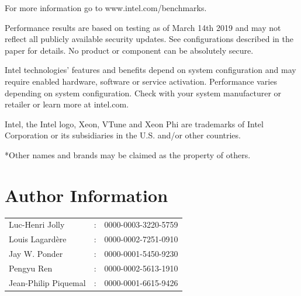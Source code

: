 \documentclass[9pt,comparison]{livecoms}
\begin{document}
For more information go to www.intel.com/benchmarks.

Performance results are based on testing as of March 14th 2019 and may not reflect all publicly available security updates.  See configurations described in the paper for details.  No product or component can be absolutely secure.

Intel technologies’ features and benefits depend on system configuration and may require enabled hardware, software or service activation. Performance varies depending on system configuration. Check with your system manufacturer or retailer or learn more at intel.com.

Intel, the Intel logo, Xeon, VTune and Xeon Phi are trademarks of Intel Corporation or its subsidiaries in the U.S. and/or other countries.

*Other names and brands may be claimed as the property of others. 

\section*{Author Information}
\makeorcid
\begin{tabular}{lcl}
 Luc-Henri Jolly &:& 0000-0003-3220-5759 \\
 Louis Lagardère &:& 0000-0002-7251-0910\\
 Jay W. Ponder& :  & 0000-0001-5450-9230\\
 Pengyu Ren &: &0000-0002-5613-1910\\
 Jean-Philip Piquemal&:& 0000-0001-6615-9426\\
 \end{tabular}




\onecolumn
\listoffigures
\listoftables
\lstlistoflistings
\end{document}
